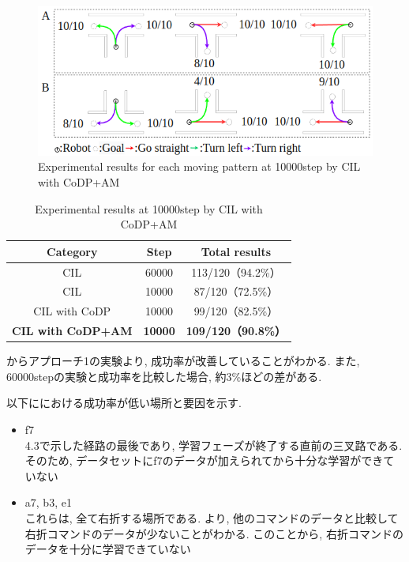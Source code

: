   
  \begin{figure}[hbtp]
    \centering
   \includegraphics[keepaspectratio, scale=0.55]
        {images/10000step_act1.5.png}
   \caption{Experimental results for each moving pattern at 10000step by CIL with CoDP+AM}
   \label{Fig:10000step_act1.5}
  \end{figure}  
  

  \begin{table}[hbtp]
    \caption{Experimental results at 10000step by CIL with CoDP+AM}
    \label{table:result4}
    \centering
    \begin{tabular}{|c|c|c|}
      \hline
      Category & Step & Total results\\
      \hline
      CIL & 60000 & 113/120（94.2\%）\\
      \hline
      CIL & 10000 & 87/120（72.5\%）\\
      \hline
      CIL with CoDP & 10000 & 99/120（82.5\%）\\
      \hline
        \textbf{CIL with CoDP+AM}
       & \textbf{10000} & \textbf{109/120（90.8\%）}\\
      \hline
    \end{tabular}
  \end{table}


  からアプローチ1の実験より, 成功率が改善していることがわかる. また, 60000stepの実験と成功率を比較した場合, 約3\%ほどの差がある. 

  
  以下ににおける成功率が低い場所と要因を示す.
  \begin{itemize}
    \item f7\\
    4.3で示した経路の最後であり, 学習フェーズが終了する直前の三叉路である. そのため, データセットにf7のデータが加えられてから十分な学習ができていない
    \item a7, b3, e1\\
    これらは, 全て右折する場所である. より, 他のコマンドのデータと比較して右折コマンドのデータが少ないことがわかる. このことから, 右折コマンドのデータを十分に学習できていない
  \end{itemize} 


